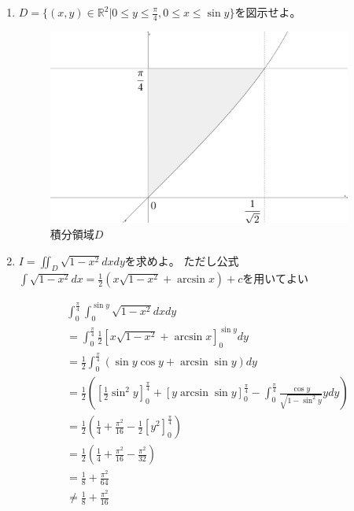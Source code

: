 \documentclass[a4paper,10pt]{jarticle}
\begin{document}
\begin{enumerate}
\item$D=\{(x,y)\in \mathbb{R}^2|0 \leq y \leq \frac{\pi}{4}, 0 \leq x \leq \sin{y}\}$を図示せよ。

\begin{figure}[H]
	\begin{center}
		\includegraphics[width=100mm,bb  = 0 0 300 200]{21.png}
	\end{center}
 	\caption{積分領域$D$}
\end{figure}

\item $I=\iint_{D} \sqrt{1-x^2} dxdy$を求めよ。
ただし公式$\int\sqrt{1-x^2}dx=\frac{1}{2}(x\sqrt{1-x^2}+\arcsin{x})+c$を用いてよい
\begin{fleqn}[30pt] \begin{gather*}
	\int_0^{\frac{\pi}{4}} \int_{0}^{\sin{y}} \sqrt{1-x^2} dx dy\\
	=\int_0^{\frac{\pi}{4}} \frac{1}{2} \left[ x\sqrt{1-x^2} + \arcsin{x} \right]_{0}^{\sin{y}} dy\\
	=\frac{1}{2} \int_0^{\frac{\pi}{4}} ( \sin{y}\cos{y}+\arcsin{\sin{y}} ) dy\\
	=\frac{1}{2} \left( \left[ \frac{1}{2}\sin^2{y} \right]^{\frac{\pi}{4}}_0 + \left[ y \arcsin{\sin{y}} \right]^{\frac{\pi}{4}}_0 - \int_0^{\frac{\pi}{4}}\frac{\cos{y}}{\sqrt{1-\sin^2{y}}}ydy \right) \\
	=\frac{1}{2} \left( \frac{1}{4} + \frac{\pi^2}{16} - \frac{1}{2}\left[ y^2 \right]^{\frac{\pi}{4}}_0 \right) \\
	=\frac{1}{2} \left( \frac{1}{4} + \frac{\pi^2}{16} -\frac{\pi^2}{32} \right) \\
	=\frac{1}{8} + \frac{\pi^2}{64}\\
	\ne \frac{1}{8}+\frac{\pi^2}{16}
\end{gather*} \end{fleqn}
\end{enumerate}
\end{document}
